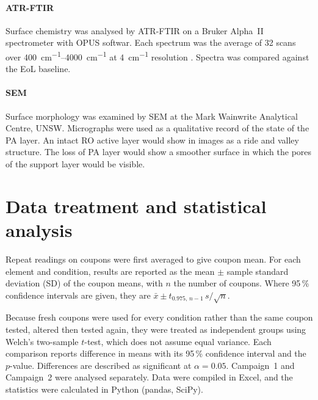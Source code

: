 \paragraph{ATR-FTIR}
Surface chemistry was analysed by ATR-FTIR on a Bruker Alpha~II spectrometer with OPUS softwar. Each spectrum was the average of 32 scans over \qtyrange{400}{4000}{cm^{-1}} at \qty{4}{cm^{-1}} resolution \citep{Ogbe2025}. Spectra was compared against the EoL baseline.  

\paragraph{SEM}
Surface morphology was examined by SEM at the Mark Wainwrite Analytical Centre, UNSW. Micrographs were used as a qualitative record of the state of the PA layer. An intact RO active layer would show in images as a ride and valley structure. The loss of PA layer would show a smoother surface in which the pores of the support layer would be visible. 


\section{Data treatment and statistical analysis}
\label{sec:stats}
Repeat readings on coupons were first averaged to give coupon mean. For each element and condition, results are reported as the mean $\pm$ sample standard deviation (SD) of the coupon means, with $n$ the number of coupons. Where 95\,\% confidence intervals are given, they are $\bar{x}\pm t_{0.975, \, n-1}\,s/\sqrt{n}$. 

Because fresh coupons were used for every condition rather than the same coupon tested, altered then tested again, they were treated as independent groups using Welch's two-sample $t$-test, which does not assume equal variance. Each comparison reports difference in means with its 95\,\% confidence interval and the $p$-value. Differences are described as significant at $\alpha = 0.05$. Campaign~1 and Campaign~2 were analysed separately. Data were compiled in Excel, and the statistics were calculated in Python (pandas, SciPy).
